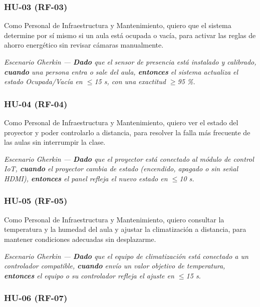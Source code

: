 \subsubsection*{HU-03 (RF-03)}


Como Personal de Infraestructura y Mantenimiento, quiero que el sistema determine por sí mismo si un aula está ocupada o vacía, para activar las reglas de ahorro energético sin revisar cámaras manualmente.

\textit{Escenario Gherkin --- \textbf{Dado} que el sensor de presencia está instalado y calibrado, \textbf{cuando} una persona entra o sale del aula, \textbf{entonces} el sistema actualiza el estado Ocupada/Vacía en $\leq$15 s, con una exactitud $\geq$95 \%.}

\subsubsection*{HU-04 (RF-04)}


Como Personal de Infraestructura y Mantenimiento, quiero ver el estado del proyector y poder controlarlo a distancia, para resolver la falla más frecuente de las aulas sin interrumpir la clase.

\textit{Escenario Gherkin --- \textbf{Dado} que el proyector está conectado al módulo de control IoT, \textbf{cuando} el proyector cambia de estado (encendido, apagado o sin señal HDMI), \textbf{entonces} el panel refleja el nuevo estado en $\leq$10 s.}

\subsubsection*{HU-05 (RF-05)}


Como Personal de Infraestructura y Mantenimiento, quiero consultar la temperatura y la humedad del aula y ajustar la climatización a distancia, para mantener condiciones adecuadas sin desplazarme.

\textit{Escenario Gherkin --- \textbf{Dado} que el equipo de climatización está conectado a un controlador compatible, \textbf{cuando} envío un valor objetivo de temperatura, \textbf{entonces} el equipo o su controlador refleja el ajuste en $\leq$15 s.}

\subsubsection*{HU-06 (RF-07)}

